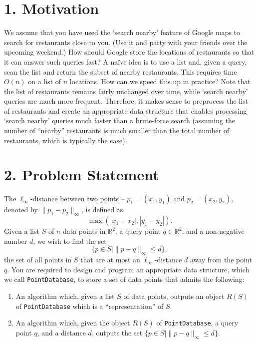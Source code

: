 \documentclass{article}
\begin{document}
\section*{1. Motivation}

We assume that you have used the ‘search nearby’ feature of Google maps to search for restaurants close to you. (Use it and party with your friends over the upcoming weekend.) How should Google store the locations of restaurants so that it can answer such queries fast? A naïve idea is to use a list and, given a query, scan the list and return the subset of nearby restaurants. This requires time $O(n)$ on a list of $n$ locations. How can we speed this up in practice? Note that the list of restaurants remains fairly unchanged over time, while ‘search nearby’ queries are much more frequent. Therefore, it makes sense to preprocess the list of restaurants and create an appropriate data structure that enables processing ‘search nearby’ queries much faster than a brute-force search (assuming the number of “nearby” restaurants is much smaller than the total number of restaurants, which is typically the case).

\section*{2. Problem Statement}

The $\ell_\infty$-distance between two points – $p_1 = (x_1, y_1)$ and $p_2 = (x_2, y_2)$, denoted by $\|p_1 - p_2\|_\infty$, is defined as
\[
\max(|x_1 - x_2|, |y_1 - y_2|).
\]
Given a list $S$ of $n$ data points in $\mathbb{R}^2$, a query point $q \in \mathbb{R}^2$, and a non-negative number $d$, we wish to find the set
\[
\{p \in S \mid \|p - q\|_\infty \leq d\},
\]
the set of all points in $S$ that are at most an $\ell_\infty$-distance $d$ away from the point $q$. You are required to design and program an appropriate data structure, which we call \texttt{PointDatabase}, to store a set of data points that admits the following:

\begin{enumerate}
    \item An algorithm which, given a list $S$ of data points, outputs an object $R(S)$ of \texttt{PointDatabase} which is a “representation” of $S$.
    
    \item An algorithm which, given the object $R(S)$ of \texttt{PointDatabase}, a query point $q$, and a distance $d$, outputs the set $\{p \in S \mid \|p - q\|_\infty \leq d\}$.
\end{enumerate}
\end{document}
